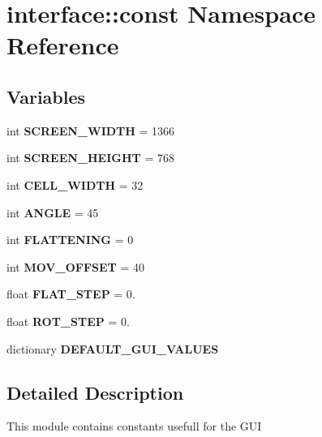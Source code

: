 \hypertarget{namespaceinterface_1_1const}{\section{interface\-:\-:const \-Namespace \-Reference}
\label{namespaceinterface_1_1const}
}
\subsection*{\-Variables}
\begin{DoxyCompactItemize}
\item 
\hypertarget{namespaceinterface_1_1const_a8ff8a908bd526191ed8c624b8cfa492f}{int {\bfseries \-S\-C\-R\-E\-E\-N\-\_\-\-W\-I\-D\-T\-H} = 1366}\label{namespaceinterface_1_1const_a8ff8a908bd526191ed8c624b8cfa492f}

\item 
\hypertarget{namespaceinterface_1_1const_aa22e5189b21079bc616070c5ee0b5164}{int {\bfseries \-S\-C\-R\-E\-E\-N\-\_\-\-H\-E\-I\-G\-H\-T} = 768}\label{namespaceinterface_1_1const_aa22e5189b21079bc616070c5ee0b5164}

\item 
\hypertarget{namespaceinterface_1_1const_ad297c8c194188fafcbd5cbb5195e7dc3}{int {\bfseries \-C\-E\-L\-L\-\_\-\-W\-I\-D\-T\-H} = 32}\label{namespaceinterface_1_1const_ad297c8c194188fafcbd5cbb5195e7dc3}

\item 
\hypertarget{namespaceinterface_1_1const_a0ef6596f0986f41996fcd7103a361301}{int {\bfseries \-A\-N\-G\-L\-E} = 45}\label{namespaceinterface_1_1const_a0ef6596f0986f41996fcd7103a361301}

\item 
\hypertarget{namespaceinterface_1_1const_a1f0908a4a2afca46541051d6032e0cb8}{int {\bfseries \-F\-L\-A\-T\-T\-E\-N\-I\-N\-G} = 0}\label{namespaceinterface_1_1const_a1f0908a4a2afca46541051d6032e0cb8}

\item 
\hypertarget{namespaceinterface_1_1const_ab5feaa48d522f1c0858e8ccf5f6c7320}{int {\bfseries \-M\-O\-V\-\_\-\-O\-F\-F\-S\-E\-T} = 40}\label{namespaceinterface_1_1const_ab5feaa48d522f1c0858e8ccf5f6c7320}

\item 
\hypertarget{namespaceinterface_1_1const_a1d67da912d6be74193e437c57493d154}{float {\bfseries \-F\-L\-A\-T\-\_\-\-S\-T\-E\-P} = 0.}\label{namespaceinterface_1_1const_a1d67da912d6be74193e437c57493d154}

\item 
\hypertarget{namespaceinterface_1_1const_a7ee87f8349da91be1edf40fd9fab7bb9}{float {\bfseries \-R\-O\-T\-\_\-\-S\-T\-E\-P} = 0.}\label{namespaceinterface_1_1const_a7ee87f8349da91be1edf40fd9fab7bb9}

\item 
\hypertarget{namespaceinterface_1_1const_a88bb4539870ff9c9abdce2aeaabcc4d5}{dictionary {\bfseries \-D\-E\-F\-A\-U\-L\-T\-\_\-\-G\-U\-I\-\_\-\-V\-A\-L\-U\-E\-S}}\label{namespaceinterface_1_1const_a88bb4539870ff9c9abdce2aeaabcc4d5}

\end{DoxyCompactItemize}


\subsection{\-Detailed \-Description}
\begin{DoxyVerb}
    This module contains constants usefull for the GUI
\end{DoxyVerb}
 